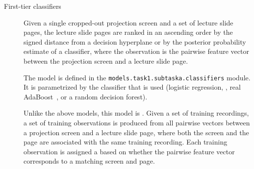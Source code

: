 \begin{description}
  \item[First-tier classifiers]
    Given a single cropped-out projection screen and a set of lecture slide
    pages, the lecture slide pages are ranked in an ascending order by the
    signed distance from a decision hyperplane or by the posterior probability
    estimate of a classifier, where the observation is the pairwise feature
    vector between the projection screen and a lecture slide page.

    The model is defined in the \texttt{models.task1.subtaska.classifiers}
    module. It is parametrized by the classifier that is used (logistic
    regression, , real AdaBoost~\cite{friedman2000additive}, or a
    random decision forest).

    Unlike the above models, this model is . Given a set of
    training recordings, a set of training observations is produced from all
    pairwise vectors between a projection screen and a lecture slide page,
    where both the screen and the page are associated with the same training
    recording. Each training observation is assigned a  based on
    whether the pairwise feature vector corresponds to a matching screen and
    page.
    

\end{description}
